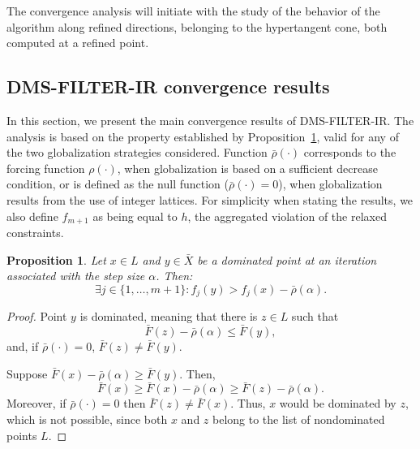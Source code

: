 \documentclass[12pt]{article}
\newtheorem{proposition}[theorem]{Proposition}
\begin{document}
The convergence analysis will initiate with the study of the
behavior of the algorithm along refined directions, belonging to
the hypertangent cone, both computed at a refined point.


\subsection{DMS-FILTER-IR convergence results} \label{op_cond}
In this section, we present the main convergence results of
DMS-FILTER-IR. The analysis is based on the property established
by Proposition~\ref{prop_dominance}, valid for any of the two
globalization strategies considered. Function $\bar{\rho}(\cdot)$
corresponds to the forcing function $\rho(\cdot)$, when
globalization is based on a sufficient decrease condition, or is
defined as the null function ($\bar{\rho}(\cdot)=0$), when
globalization results from the use of integer lattices. For
simplicity when stating the results, we also define $f_{m+1}$ as
being equal to $h$, the aggregated violation of the relaxed
constraints.

\begin{proposition}\label{prop_dominance}
Let $x\in L$ and $y\in \bar{X}$ be a dominated point at an
iteration associated with the step size $\alpha$. Then:
$$\exists j\in\{1,\ldots,m+1\}:f_j(y)>f_j(x)-\bar{\rho}(\alpha).$$
\end{proposition}
\begin{proof}
Point $y$ is dominated, meaning that there is $z\in L$ such that
$$\bar{F}(z)-\bar{\rho}(\alpha)\leq \bar{F}(y),$$
and, if $\bar{\rho}(\cdot)=0$, $\bar{F}(z)\neq\bar{F}(y)$.

Suppose $\bar{F}(x)-\bar{\rho}(\alpha)\geq \bar{F}(y)$. Then,
$$\bar{F}(x)\geq \bar{F}(x)-\bar{\rho}(\alpha)\geq \bar{F}(z)-\bar{\rho}(\alpha).$$
Moreover, if $\bar{\rho}(\cdot)=0$ then $\bar{F}(z)\neq
\bar{F}(x)$. Thus, $x$ would be dominated by $z$, which is not
possible, since both $x$ and $z$ belong to the list of
nondominated points $L$.
\end{proof}
\end{document}
